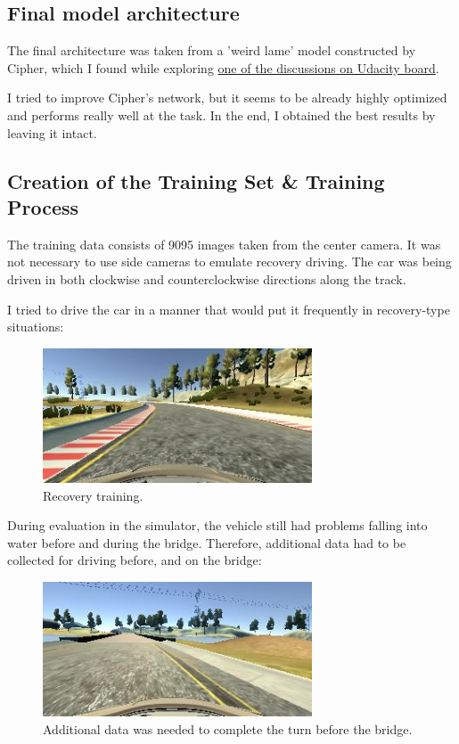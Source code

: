 \documentclass[a4paper,10pt]{article}
\begin{document}
\subsection{Final model architecture}

The final architecture was taken from a 'weird lame' model constructed by Cipher,
which I found while exploring \href{https://discussions.udacity.com/t/steering-stuck-hard-right/226720/24}{one of the discussions on Udacity board}.

I tried to improve Cipher's network, but it seems to be already highly optimized and performs really well at the task.
In the end, I obtained the best results by leaving it intact.

\subsection{Creation of the Training Set \& Training Process}\label{CTT}

The training data consists of 9095 images taken from the center camera.
It was not necessary to use side cameras to emulate recovery driving.
The car was being driven in both clockwise and counterclockwise directions along the track.

I tried to drive the car in a manner that would put it frequently in recovery-type situations:

\begin{figure}[h]
  \begin{center}
  \includegraphics[width=80mm]{recovery.jpg}
  \caption{Recovery training.}
\end{center}
\end{figure}

During evaluation in the simulator, the vehicle still had problems falling into water before and during the bridge. Therefore, additional data had to be collected for driving
before, and on the bridge:

\begin{figure}[h]
  \begin{center}
\includegraphics[width=80mm]{bridge.jpg}
\caption{Additional data was needed to complete the turn before the bridge.}
\end{center}
\end{figure}
\end{document}
